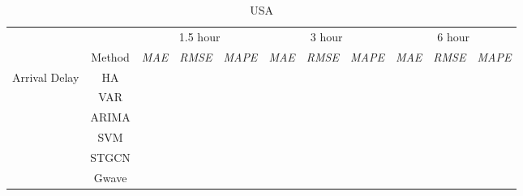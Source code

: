 \documentclass[12pt,a4paper]{report}
\begin{document}
\renewcommand{\arraystretch}{0.85}
\begin{table}[h]
    \caption{USA}
    \centering
    \footnotesize
    \begin{tabular}{ccccccccccc}
        \toprule
                                          &                 & \multicolumn{3}{c}{1.5 hour} & \multicolumn{3}{c}{3 hour} & \multicolumn{3}{c}{6 hour}                                                                                                                             \\
                                          & Method          & \textit{MAE}                 & \textit{RMSE}              & \multicolumn{1}{c|}{\textit{MAPE} } & \textit{MAE} & \textit{RMSE} & \multicolumn{1}{c|}{\textit{MAPE}} & \textit{MAE} & \textit{RMSE} & \textit{MAPE} \\ \midrule
        \multirow{11}{*}{Arrival Delay}   & HA              &                              &                            & \multicolumn{1}{c|}{}               &              &               & \multicolumn{1}{c|}{}              &              &               &               \\
                                          & VAR             &                              &                            & \multicolumn{1}{c|}{}               &              &               & \multicolumn{1}{c|}{}              &              &               &               \\
                                          & ARIMA           &                              &                            & \multicolumn{1}{c|}{}               &              &               & \multicolumn{1}{c|}{}              &              &               &               \\
                                          & SVM             &                              &                            & \multicolumn{1}{c|}{}               &              &               & \multicolumn{1}{c|}{}              &              &               &               \\
                                          & STGCN           &                              &                            & \multicolumn{1}{c|}{}               &              &               & \multicolumn{1}{c|}{}              &              &               &               \\
                                          & Gwave           &                              &                            & \multicolumn{1}{c|}{}               &              &               & \multicolumn{1}{c|}{}              &              &               &               \\

\end{tabular}
\end{table}
\end{document}
